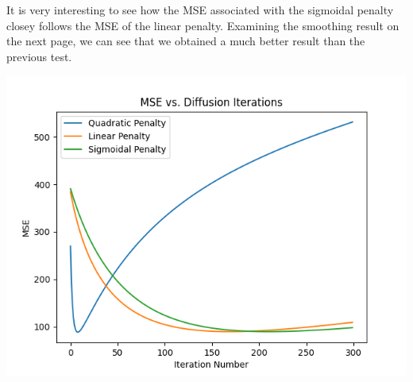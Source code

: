 \documentclass{article}
\begin{document}
  \noindent
  It is very interesting to see how the MSE associated with the
  sigmoidal penalty closey follows the MSE of the linear penalty.
  Examining the smoothing result on the next page, we can see that
  we obtained a much better result than the previous test.

  \begin{center}
    \includegraphics[scale=0.5]{../generated_images/MSE_test2.png}\\
  \end{center}
\end{document}
